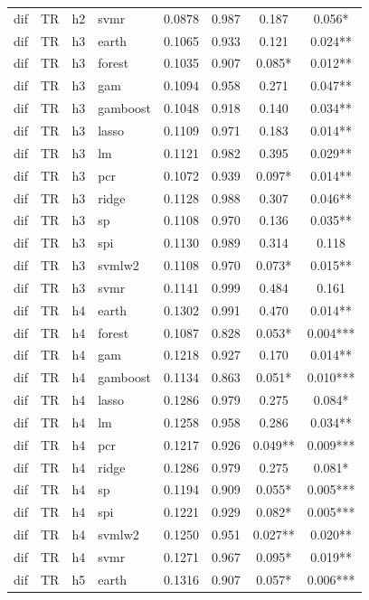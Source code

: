 \begin{ThreePartTable}
\begin{longtable}[t]{llclcccc}
dif & TR & h2 & svmr & 0.0878 & 0.987 & 0.187 & 0.056*\\
\addlinespace
dif & TR & h3 & earth & 0.1065 & 0.933 & 0.121 & 0.024**\\
dif & TR & h3 & forest & 0.1035 & 0.907 & 0.085* & 0.012**\\
dif & TR & h3 & gam & 0.1094 & 0.958 & 0.271 & 0.047**\\
dif & TR & h3 & gamboost & 0.1048 & 0.918 & 0.140 & 0.034**\\
dif & TR & h3 & lasso & 0.1109 & 0.971 & 0.183 & 0.014**\\
dif & TR & h3 & lm & 0.1121 & 0.982 & 0.395 & 0.029**\\
dif & TR & h3 & pcr & 0.1072 & 0.939 & 0.097* & 0.014**\\
dif & TR & h3 & ridge & 0.1128 & 0.988 & 0.307 & 0.046**\\
dif & TR & h3 & sp & 0.1108 & 0.970 & 0.136 & 0.035**\\
dif & TR & h3 & spi & 0.1130 & 0.989 & 0.314 & 0.118\\
dif & TR & h3 & svmlw2 & 0.1108 & 0.970 & 0.073* & 0.015**\\
dif & TR & h3 & svmr & 0.1141 & 0.999 & 0.484 & 0.161\\
\addlinespace
dif & TR & h4 & earth & 0.1302 & 0.991 & 0.470 & 0.014**\\
dif & TR & h4 & forest & 0.1087 & 0.828 & 0.053* & 0.004***\\
dif & TR & h4 & gam & 0.1218 & 0.927 & 0.170 & 0.014**\\
dif & TR & h4 & gamboost & 0.1134 & 0.863 & 0.051* & 0.010***\\
dif & TR & h4 & lasso & 0.1286 & 0.979 & 0.275 & 0.084*\\
dif & TR & h4 & lm & 0.1258 & 0.958 & 0.286 & 0.034**\\
dif & TR & h4 & pcr & 0.1217 & 0.926 & 0.049** & 0.009***\\
dif & TR & h4 & ridge & 0.1286 & 0.979 & 0.275 & 0.081*\\
dif & TR & h4 & sp & 0.1194 & 0.909 & 0.055* & 0.005***\\
dif & TR & h4 & spi & 0.1221 & 0.929 & 0.082* & 0.005***\\
dif & TR & h4 & svmlw2 & 0.1250 & 0.951 & 0.027** & 0.020**\\
dif & TR & h4 & svmr & 0.1271 & 0.967 & 0.095* & 0.019**\\
\addlinespace
dif & TR & h5 & earth & 0.1316 & 0.907 & 0.057* & 0.006***\\

\end{longtable}
\end{ThreePartTable}
